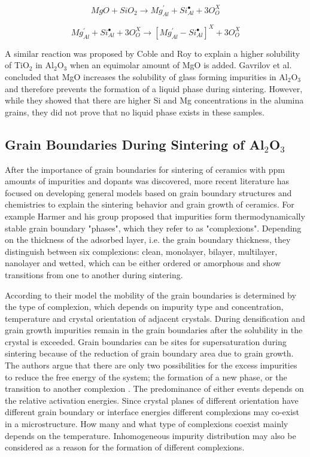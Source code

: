 \begin{equation}
\label{Ch1-eq: eq1}
MgO + SiO_{2} \rightarrow Mg_{Al}^{'} + Si_{Al}^{\bullet} + 3O_{O}^{X}
\end{equation}

\begin{equation}
\label{Ch1-eq: eq2}
Mg_{Al}^{'} + Si_{Al}^{\bullet} + 3O_{O}^{X} \rightarrow \left[ Mg_{Al}^{'} - Si_{Al}^{\bullet} \right]^{X} + 3O_{O}^{X}
\end{equation}

\noindent A similar reaction was proposed by Coble and Roy \cite{Roy1968} to explain a higher solubility of TiO$_{2}$ in Al$_{2}$O$_{3}$ when an equimolar amount of MgO is added. Gavrilov et al. \cite{Gavrilov1999} concluded that MgO increases the solubility of glass forming impurities in Al$_{2}$O$_{3}$ and therefore prevents the formation of a liquid phase during sintering. However, while they showed that there are higher Si and Mg concentrations in the alumina grains, they did not prove that no liquid phase exists in these samples. 

\subsection{Grain Boundaries During Sintering of Al$_{2}$O$_{3}$}
After the importance of grain boundaries for sintering of ceramics with ppm amounts of impurities and dopants was discovered, more recent literature has focused on developing general models based on grain boundary structures and chemistries to explain the sintering behavior and grain growth of ceramics. For example Harmer and his group \cite{Dillon2007a,Dillon2010,Dillon2007,Cantwell2014} proposed that impurities form thermodynamically stable grain boundary "phases", which they refer to as "complexions". Depending on the thickness of the adsorbed layer, i.e. the grain boundary thickness, they distinguish between six complexions: clean, monolayer, bilayer, multilayer, nanolayer and wetted, which can be either ordered or amorphous and show transitions from one to another during sintering. 

According to their model the mobility of the grain boundaries is determined by the type of complexion, which depends on impurity type and concentration, temperature and crystal orientation of adjacent crystals. During densification and grain growth impurities remain in the grain boundaries after the solubility in the crystal is exceeded. Grain boundaries can be sites for supersaturation during sintering because of the reduction of grain boundary area due to grain growth. The authors argue that there are only two possibilities for the excess impurities to reduce the free energy of the system; the formation of a new phase, or the transition to another complexion \cite{Dillon2010}. The predominance of either events depends on the relative activation energies. Since crystal planes of different orientation have different grain boundary or interface energies different complexions may co-exist in a microstructure. How many and what type of complexions coexist mainly depends on the temperature. Inhomogeneous impurity distribution may also be considered as a reason for the formation of different complexions. 

